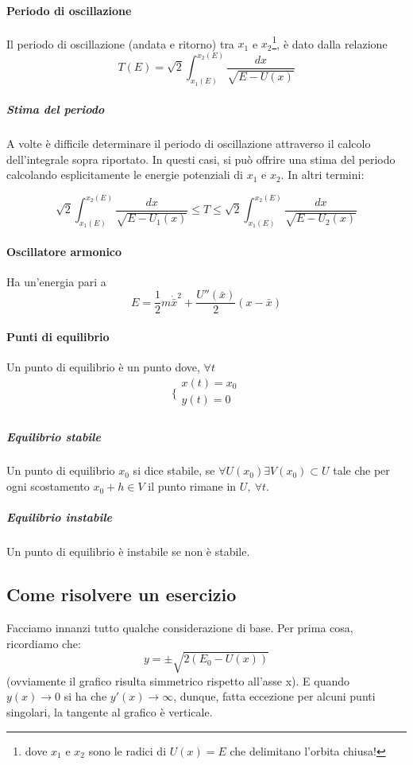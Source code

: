 \documentclass[a4paper,12pt]{article}
\begin{document}
\paragraph{Periodo di oscillazione}
Il periodo di oscillazione (andata e ritorno) tra $x_1$ e $x_2$\footnote{dove $x_1$ e $x_2$ sono le radici di $U(x) = E $ che delimitano l'orbita chiusa! }, è dato dalla relazione
$$ T(E) = \sqrt{2}\int_{x_1(E)}^{x_2(E)} \dfrac{dx}{\sqrt{E-U(x)}}$$
\subparagraph{Stima del periodo}
A volte è difficile determinare il periodo di oscillazione attraverso il calcolo dell'integrale sopra riportato.
In questi casi, si può offrire una stima del periodo calcolando esplicitamente le energie potenziali di $x_1$ e $x_2$. In altri termini:

$$ \sqrt{2}\int_{x_1(E)}^{x_2(E)} \dfrac{dx}{\sqrt{E-U_1(x)}} \leq T \leq \sqrt{2}\int_{x_1(E)}^{x_2(E)} \dfrac{dx}{\sqrt{E-U_2(x)}} $$

\paragraph{Oscillatore armonico}
Ha un'energia pari a
$$ E = \dfrac{1}{2} m \dot{\bar{x}}^2 + \dfrac{U''(\bar{x})}{2} (x-\bar{x})$$


\paragraph{Punti di equilibrio}
Un punto di equilibrio è un punto dove, $\forall t$
$$\bigg\{ \begin{array}{l}
x(t) = x_0\\
y(t) = 0\\
\end{array}$$
\subparagraph{Equilibrio stabile}
Un punto di equilibrio $x_0$ si dice stabile, se $\forall U(x_0) \exists V(x_0) \subset U $  tale che per ogni scostamento $x_0 + h \in V$ il punto rimane in $U,\ \forall t$.
\subparagraph{Equilibrio instabile}
Un punto di equilibrio è instabile se non è stabile.

\subsection{Come risolvere un esercizio}
Facciamo innanzi tutto qualche considerazione di base. Per prima cosa, ricordiamo che:
$$y = \pm \sqrt{2(E_0-U(x))}$$
    (ovviamente il grafico risulta simmetrico rispetto all'asse x).
E quando $y(x)\to 0$ si ha che $y'(x) \to \infty$, dunque, fatta eccezione per alcuni punti singolari, la tangente al grafico è verticale.
\end{document}
